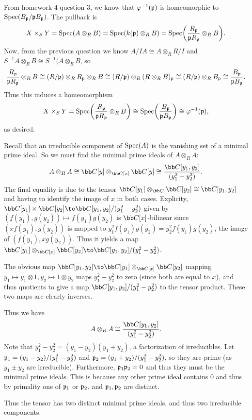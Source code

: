     \item From homework 4 question 3, we know that $\varphi^{-1}({{\frak p}})$ is homeomorphic to ${\rm Spec}(B_{{\frak p}}/{{\frak p}} B_{{\frak p}})$.
    The pullback is
    $$ X\times_SY = {\rm Spec}(A\otimes_RB) = {\rm Spec}(k({{\frak p}})\otimes_RB) = {\rm Spec}\mathopen{}\mathclose{\left({{R_{{\frak p}}}\over{{{\frak p}}R_{{\frak p}}}}\otimes_RB\right)} . $$
    Now, from the previous question we know $A/IA\cong A\otimes_RR/I$ and $S^{-1}A\otimes_RB\cong S^{-1}(A\otimes_RB$, so
    $$ {{R_{{\frak p}}}\over{{{\frak p}}R_{{\frak p}}}} \otimes_RB \cong (R/{{\frak p}}) \otimes_R R_{{\frak p}} \otimes_RB \cong (R/{{\frak p}}) \otimes_R (R\otimes_RB)_{{\frak p}} \cong
    (R/{{\frak p}}) \otimes_R B_{{\frak p}} \cong {{B_{{\frak p}}}\over{{{\frak p}}B_{{\frak p}}}} . $$
    Thus this induces a homeomorphism
    $$ X\times_SY = {\rm Spec}\mathopen{}\mathclose{\left({{R_{{\frak p}}}\over{{{\frak p}}R_{{\frak p}}}}\otimes_RB\right)} \cong {\rm Spec}\mathopen{}\mathclose{\left({{B_{{\frak p}}}\over{{{\frak p}}B_{{\frak p}}}}\right)} \cong \varphi^{-1}({{\frak p}}) , $$
    as desired.

    \item Recall that an irreducible component of ${\rm Spec}(A)$ is the vanishing set of a minimal prime ideal.
    So we must find the minimal prime ideals of $A\otimes_RA$:
    $$ A\otimes_RA \cong \bC[y] \otimes_{\bC[x]} \bC[y] \cong \frac{\bC[y_1,y_2]}{(y_1^2-y_2^2)} . $$
    The final equality is due to the tensor $\bC[y_1]\otimes_\bC\bC[y_2]\cong\bC[y_1,y_2]$ and having to identify the image of $x$
    in both cases.
    Explicity, $\bC[y_1]\times\bC[y_2]\to\bC[y_1,y_2]/(y_1^2-y_2^2)$ given by $(f(y_1),g(y_2))\mapsto f(y_1)g(y_2)$ is $\bC[x]$-bilinear since
    $(xf(y_1),g(y_2))$ is mapped to $y_1^2f(y_1)g(y_2)=y_2^2f(y_1)g(y_2)$, the image of $(f(y_1),xg(y_2))$.
    Thus it yields a map $\bC[y_1]\otimes_{\bC[x]}\bC[y_2]\to\bC[y_1,y_2]/(y_1^2-y_2^2)$.

    The obvious map $\bC[y_1,y_2]\to\bC[y_1]\otimes_{\bC[x]}\bC[y_2]$ mapping $y_1\mapsto y_1\otimes1,y_2\mapsto 1\otimes y_2$ maps
    $y_1^2-y_2^2$ to zero (since both are equal to $x$), and thus quotients to give a map $\bC[y_1,y_2]/(y_1^2-y_2^2)$ to the tensor product.
    These two maps are clearly inverses.

    Thus we have
    $$ A\otimes_RA \cong \frac{\bC[y_1,y_2]}{(y_1^2-y_2^2)} . $$
    Note that $y_1^2-y_2^2=(y_1-y_2)(y_1+y_2)$, a factorization of irreducibles.
    Let ${{\frak p}}_1=(y_1-y_2)/(y_1^2-y_2^2)$ and ${{\frak p}}_2=(y_1+y_2)/(y_1^2-y_2^2)$, so they are prime (as $y_1\pm y_2$ are irreducible).
    Furthermore, ${{\frak p}}_1{{\frak p}}_2=0$ and thus they must be the minimal prime ideals.
    This is because any other prime ideal contains $0$ and thus by primality one of ${{\frak p}}_1$ or ${{\frak p}}_2$, and ${{\frak p}}_1,{{\frak p}}_2$ are distinct.

    Thus the tensor has two distinct minimal prime ideals, and thus two irreducible components.

